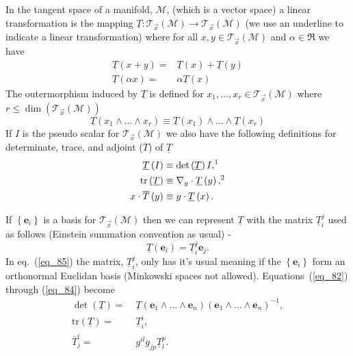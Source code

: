 \documentclass[12pt,twoside,openright]{memoir}
\newcommand{\bm}[1]{\boldsymbol{#1}}
\newcommand{\lp}{\left (}
\newcommand{\rp}{\right )}
\newcommand{\lbrc}{\left \{}
\newcommand{\rbrc}{\right \}}
\newcommand{\set}[1]{\lbrc {#1} \rbrc}
\newcommand{\W}{\wedge}
\newcommand{\f}[2]{{#1}\lp {#2} \rp}
\newcommand{\paren}[1]{\lp {#1} \rp}
\newcommand{\be}{\begin{equation}}
\newcommand{\ee}{\end{equation}}
\newcommand{\eb}{\bm{e}}
\newcommand{\Tn}[2]{\f{\mathcal{T}_{#2}}{#1}}
\newcommand{\tr}{\mbox{tr}}
\begin{document}
In the tangent space of a manifold, $\mathcal{M}$, (which is a vector space) a linear transformation is the mapping 
$\underline{T}\colon\Tn{\mathcal{M}}{\vec{x}}\rightarrow\Tn{\mathcal{M}}{\vec{x}}$ (we use an underline to indicate
a linear transformation) where for all $x,y\in \Tn{\mathcal{M}}{\vec{x}}$ and $\alpha\in\Re$ we have
\begin{align}
	\f{\underline{T}}{x+y} =& \f{\underline{T}}{x} + \f{\underline{T}}{y} \\
	\f{\underline{T}}{\alpha x} =& \alpha\f{\underline{T}}{x}
\end{align}
The outermorphism induced by $\underline{T}$ is defined for $x_{1},\dots,x_{r}\in\Tn{\mathcal{M}}{\vec{x}}$ where 
$r\le\f{\dim}{\Tn{\mathcal{M}}{\vec{x}}}$
\be
	\f{\underline{T}}{x_{1}\W\dots\W x_{r}} \equiv \f{\underline{T}}{x_{1}}\W\dots\W\f{\underline{T}}{x_{r}}
\ee
If $I$ is the pseudo scalar for $\Tn{\mathcal{M}}{\vec{x}}$ we also have the following definitions for determinate, trace,
and adjoint ($\overline{T}$) of $\underline{T}$
\begin{align}
	\f{\underline{T}}{I} \equiv&\; \f{\det}{\underline{T}}I\text{,\footnotemark} \label{eq_82}\\ 
	\f{\tr}{\underline{T}} \equiv&\; \nabla_{y}\cdot\f{\underline{T}}{y}\text{,\footnotemark} \label{eq_83}\\ \addtocounter{footnote}{-1}
	x\cdot \f{\overline{T}}{y} \equiv&\; y\cdot \f{\underline{T}}{x}.\label{eq_84}
\end{align}
\addtocounter{footnote}{1}
If $\set{\eb_{i}}$ is a basis for $\Tn{\mathcal{M}}{\vec{x}}$ then we can represent $\underline{T}$ with the matrix $\underline{T}_{i}^{j}$ used
as follows (Einstein summation convention as usual) -
\be\label{eq_85}
	\f{\underline{T}}{\eb_{i}} = \underline{T}_{i}^{j}\eb_{j}.
\ee
In eq.~(\ref{eq_85}) the matrix, $\underline{T}_{i}^{j}$, only has it's usual meaning if the $\set{\eb_{i}}$ form an orthonormal Euclidan 
basis (Minkowski spaces not allowed). Equations~(\ref{eq_82}) through (\ref{eq_84}) become
\begin{align}
	\f{\det}{\underline{T}} =&\; \f{\underline{T}}{\eb_{1}\W\dots\W\eb_{n}}\paren{\eb_{1}\W\dots\W\eb_{n}}^{-1},\\
	\f{\tr}{\underline{T}} =&\; \underline{T}_{i}^{i},\\
	\overline{T}_{j}^{i} =&\;  g^{il}g_{jp}\underline{T}_{l}^{p}.
\end{align}
\end{document}
